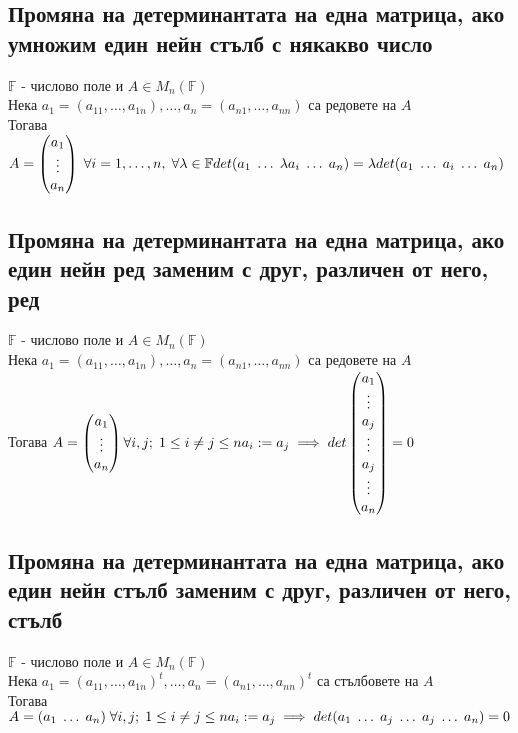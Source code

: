 \documentclass{article}
\newcommand{\F}{\mathbb{F}}
\newcommand{\ieqn}{i = 1, \dots, n}
\newcommand{\forallij}{\forall i, j; \; 1 \leq i \neq j \leq n}
\newcommand{\arows}{Нека \(a_1 = (a_{11}, \dots, a_{1n}), \dots, a_n = (a_{n1}, \dots, a_{nn})\) са редовете на \(A\)\\ Тогава }
\newcommand{\acols}{Нека \(a_1 = (a_{11}, \dots, a_{1n})^t, \dots, a_n = (a_{n1}, \dots, a_{nn})^t\) са стълбовете на \(A\)\\ Тогава }
\newcommand{\leta}{\(\F\) - числово поле и \(A \in M_n(\F)\)}
\begin{document}
    \subsection{Промяна на детерминантата на една матрица, ако умножим един нейн стълб с някакво число}
    \leta\\
    \arows \(A = \begin{pmatrix} a_1\\ \vdots\\ a_n \end{pmatrix} \; \forall \ieqn, \; \forall \lambda \in \F\\
    det(a_1 \; \dots \; \lambda a_i \; \dots \; a_n) = \lambda det(a_1 \; \dots \; a_i \; \dots \; a_n)\)
    \subsection{Промяна на детерминантата на една матрица, ако един нейн ред заменим с друг, различен от него, ред}
    \leta\\
    \arows \(A = \begin{pmatrix} a_1\\ \vdots\\ a_n \end{pmatrix} \forallij\\
    a_i := a_j \implies det\begin{pmatrix} a_1\\ \vdots\\ a_j\\ \vdots\\ a_j\\ \vdots\\ a_n \end{pmatrix} = 0\)
    \subsection{Промяна на детерминантата на една матрица, ако един нейн стълб заменим с друг, различен от него, стълб}
    \leta\\
    \acols \(A = (a_1 \; \dots \; a_n) \; \forallij\\
    a_i := a_j \implies det(a_1 \; \dots \; a_j \; \dots \; a_j \; \dots \; a_n) = 0\)
\end{document}
